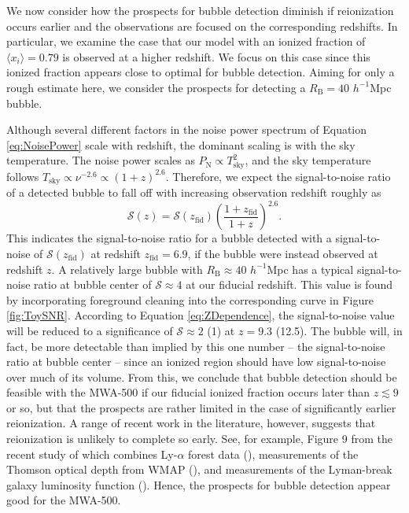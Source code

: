 We now consider how the prospects for bubble detection diminish if reionization occurs
earlier and the observations are focused on the corresponding redshifts.
In particular, we examine the case that our model with an ionized fraction
of $\langle x_i \rangle = 0.79$ is observed at a higher redshift. We focus on this case since
this ionized fraction appears close to optimal for bubble detection.
Aiming for only a rough estimate here, we consider the prospects for
detecting a $R_{\text{B}} = 40$ $h^{-1}$Mpc bubble. 

Although several different factors in the noise power spectrum of
Equation \ref{eq:NoisePower} scale with redshift, the dominant
scaling is with the sky temperature. The noise power scales
as $P_{\text{N}} \propto T_{\text{sky}}^{2}$, and the
sky temperature follows $T_{\text{sky}} \propto \nu^{-2.6} \propto
(1+z)^{2.6}$. Therefore, we expect the signal-to-noise ratio of
a detected bubble to fall off with increasing observation redshift roughly as
\begin{equation}
\mathcal{S}(z) = \mathcal{S}(z_{\text{fid}}) \left(\frac{1+z_{\text{fid}}}{1+z}\right)^{2.6}. \label{eq:ZDependence}
\end{equation}
This indicates the signal-to-noise ratio for a bubble detected with
a signal-to-noise of $\mathcal{S}(z_{\text{fid}})$ at redshift $z_{\text{fid}} = 6.9$, 
if the bubble were instead observed at redshift $z$. A relatively large bubble with
$R_{\text{B}} \approx 40$ $h^{-1}$Mpc has a typical signal-to-noise ratio at bubble center 
of $\mathcal{S} \approx 4$
at our fiducial redshift. This value is found by incorporating foreground cleaning into the corresponding curve in Figure \ref{fig:ToySNR}. 
According to Equation \ref{eq:ZDependence}, the signal-to-noise value will be reduced to a significance of $\mathcal{S}
\approx 2$ (1) at $z = 9.3$ (12.5). The bubble will, in fact, be more detectable than implied by this one number -- the
signal-to-noise ratio at bubble center -- since
an ionized region should have low signal-to-noise over much of its volume. From this, we conclude that bubble
detection should be feasible with the MWA-500 if our fiducial ionized fraction occurs later than $z \lesssim 9$ or so,
but that the prospects are rather limited in the case of significantly earlier
reionization. A range of recent work in the literature, however, suggests that
reionization is unlikely to complete so early. See, for example, Figure 9 from the recent
study of \citet{Kuhlen:2012vy} which combines
Ly-$\alpha$ forest data (\citealt{Fan:2005es}), measurements of the
Thomson optical depth from WMAP (\citealt{Komatsu:2010fb}), and measurements of the Lyman-break
galaxy luminosity function (\citealt{Bouwens:2009qs}). Hence, the prospects for bubble detection appear good for the MWA-500.


